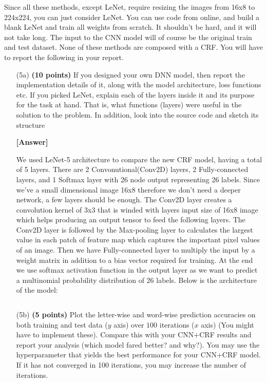 \documentclass[11pt]{report}
\begin{document}
Since all these methods, except LeNet, require resizing the images from 16x8 to 224x224, you can just consider LeNet.
You can use code from online, and build a blank LeNet and train all weights from scratch.  It shouldn't be hard, and it will not take long.
The input to the CNN model will of course be the original train and test
dataset. None of these methods are composed with a CRF.
You will have to report the following in your report.
%
\begin{itemize}
\item[(5a)] \textbf{(10 points)} If you designed your own DNN model, then report
  the implementation details of it, along with the model architecture, loss
  functions etc. If you picked LeNet, explain each of the
  layers inside it and its purpose for the task at hand. 
  That is, what functions (layers) were useful in the solution to the
  problem. In addition, look into the source code and sketch its structure

\item[\textbf{[Answer]} ]{
    We used LeNet-5 architecture to compare the new CRF model, having a total of 5 layers. There are 2 Convonutional(Conv2D) layers, 2 Fully-connected layers, and 1 Softmax layer with 26 node output representing 26 labels. Since we've a small dimensional image 16x8 therefore we don't need a deeper network, a few layers should be enough. The Conv2D layer creates a convolution kernel of 3x3 that is winded with layers input size of 16x8 image which helps producing an output tensor to feed the following layers. The Conv2D layer is followed by the Max-pooling layer to calculates the largest value in each patch of feature map which captures the important pixel values of an image. Then we have Fully-connected layer to multiply the input by a weight matrix in addition to a bias vector required for training. At the end we use softmax activation function in the output layer as we want to predict a multinomial probability distribution of 26 labels. Below is the architecture of the model:
\begin{lstlisting}

\end{lstlisting}
}

	
\item[(5b)] \textbf{(5 points)} Plot the letter-wise and word-wise prediction
  accuracies on both training and test data (\(y\) axis) over \(100\) iterations
  (\(x\) axis) (You might have to implement these). Compare this with your CNN+CRF
  results and report your analysis (which model fared better? and why?). You may
  use the hyperparameter that yields the best performance for your CNN+CRF
  model.
  If it has not converged in 100 iterations, you may increase the number of iterations.
  

\end{itemize}
\end{document}
